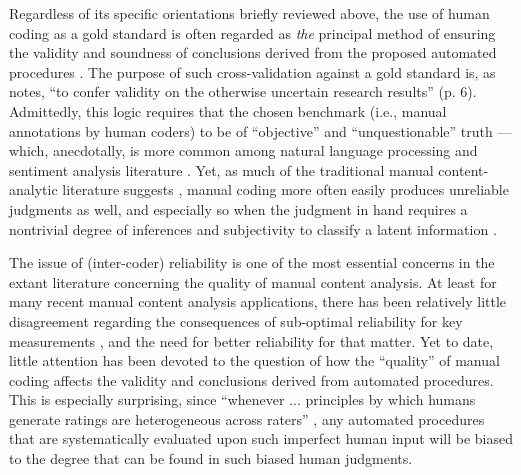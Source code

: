 \documentclass[man, 12pt, a4paper, nolmodern, noextraspace]{apa6}
\begin{document}
    Regardless of its specific orientations briefly reviewed above, the use of human coding as a gold standard is often regarded as \textit{the} principal method of ensuring the validity and soundness of conclusions derived from the proposed automated procedures \parencites[e.g., ][]{grimmer2013text, dimaggio2015adapting}. The purpose of such cross-validation against a gold standard is, as \textcite{Krippendorff2008validity} notes, \enquote{to confer validity on the otherwise uncertain research results} (p. 6). Admittedly, this logic requires that the chosen benchmark (i.e., manual annotations by human coders) to be of \enquote{objective} and \enquote{unquestionable} truth --- which, anecdotally, is more common among natural language processing and sentiment analysis literature \parencites[][]{dimaggio2015adapting}. Yet, as much of the traditional manual content-analytic literature suggests \parencites[e.g.,][]{krippendorff2004reliability, hayes2007answering, lombard2002content, ennser2018impact}, manual coding more often easily produces unreliable judgments as well, and especially so when the judgment in hand requires a nontrivial degree of inferences and subjectivity to classify a latent information \parencites[][]{riff2014analyzing, Krippendorff2013}.       
    
    The issue of (inter-coder) reliability is one of the most essential concerns in the extant literature concerning the quality of manual content analysis. At least for many recent manual content analysis applications, there has been relatively little disagreement regarding the consequences of sub-optimal reliability for key measurements \parencites[][]{krippendorff2004reliability, Krippendorff2013}, and the need for better reliability for that matter. Yet to date, little attention has been devoted to the question of how the \enquote{quality} of manual coding affects the validity and conclusions derived from automated procedures. This is especially surprising, since \enquote{whenever ... principles by which humans generate ratings are heterogeneous across raters} \parencites[][p. 4]{dimaggio2015adapting}, any automated procedures that are systematically evaluated upon such imperfect human input will be biased to the degree that can be found in such biased human judgments. 
    
\end{document}
